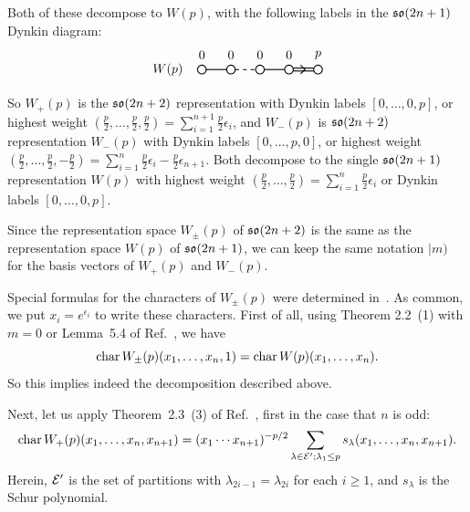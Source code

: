 \documentclass{SciPost}
\begin{document}
Both of these decompose to $W(p)$, with the following labels in the $\mathfrak{so}(2n+1)$ Dynkin diagram:
\[
\begin{tikzpicture}[scale=.4]
    \draw (-1,0) node[anchor=east]  {$W(p)$};
    \foreach \x in {0,...,3}
    \draw[xshift=\x cm,thick] (\x cm,0) circle (.3cm);
    \draw[xshift=4 cm,thick] (4 cm, 0) circle (.3 cm);
    \draw[thick] (0.3 cm,0) -- +(1.4 cm,0);
		\draw[thick,dashed] (2.3 cm,0) -- +(1.4 cm,0);
		\draw[thick] (4.3 cm,0) -- +(1.4 cm,0);
    \draw[thick] (6.3 cm, .1 cm) -- +(1.4 cm,0);
    \draw[thick] (6.3 cm, -.1 cm) -- +(1.4 cm,0);
		\draw[thick] (6.8 cm,0.3 cm) -- (7.1 cm, 0 cm) -- (6.8 cm, -0.3 cm); %
		\draw (0 cm,1 cm) node {$0$}; \draw (2 cm,1 cm) node {$0$}; \draw (4 cm,1 cm) node {$0$}; \draw (6 cm,1 cm) node {$0$}; \draw (8 cm,1 cm) node {$p$};
  \end{tikzpicture}
\]
So $W_+(p)$ is the $\mathfrak{so}(2n+2)$ representation with Dynkin labels $[0,\ldots,0,p]$, or highest weight
$(\frac{p}{2}, \ldots,\frac{p}{2}, \frac{p}{2}) = \sum_{i=1}^{n+1} \frac{p}{2}\epsilon_i$,
and $W_-(p)$ is $\mathfrak{so}(2n+2)$ representation $W_-(p)$ with Dynkin labels $[0,\ldots,p,0]$, or highest weight
$(\frac{p}{2}, \ldots, \frac{p}{2},-\frac{p}{2}) = \sum_{i=1}^{n} \frac{p}{2}\epsilon_i-\frac{p}{2}\epsilon_{n+1}$.
Both decompose to the single $\mathfrak{so}(2n+1)$ representation $W(p)$ with highest weight $(\frac{p}{2}, \ldots, \frac{p}{2}) = \sum_{i=1}^n \frac{p}{2}\epsilon_i$ or 
Dynkin labels $[0,\ldots,0,p]$.

Since the representation space $W_\pm(p)$ of $\mathfrak{so}(2n+2)$ is the same as the representation space $W(p)$ of $\mathfrak{so}(2n+1)$,
we can keep the same notation $|m)$ for the basis vectors of $W_+(p)$ and $W_-(p)$.

Special formulas for the characters of $W_\pm(p)$ were determined in~\cite{Okada}.
As common, we put $x_i=e^{\epsilon_i}$ to write these characters.
First of all, using Theorem 2.2~(1) with $m=0$ or Lemma~5.4 of Ref.~\cite{Okada}, we have 
\begin{equation}
 \mathop{\rm char}\nolimits W_\pm(p)(x_1,\ldots,x_n,1) = \mathop{\rm char}\nolimits W(p)(x_1,\ldots,x_n).
\end{equation}
So this implies indeed the decomposition described above.

Next, let us apply Theorem~2.3~(3) of Ref.~\cite{Okada}, first in the case that $n$ is odd:
\begin{equation}
\mathop{\rm char}\nolimits W_+(p)(x_1,\ldots,x_n,x_{n+1})=(x_1\cdots x_{n+1})^{-p/2} \sum_{\lambda\in {\cal E}'; \lambda_1\leq p} s_\lambda(x_1,\ldots,x_n,x_{n+1}).
\end{equation}
Herein, ${\cal E}'$ is the set of partitions with $\lambda_{2i-1}=\lambda_{2i}$ for each $i\geq 1$, and $s_\lambda$ is the Schur polynomial.
\end{document}
